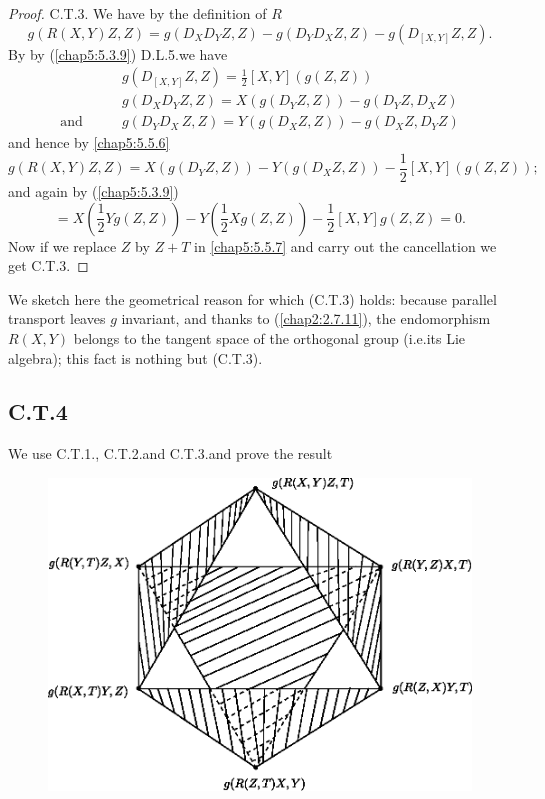 \begin{proof}
C.T.3. We have by the definition of $R$
\begin{equation*}
g(R(X,Y)Z,Z)=g(D_{X}D_{Y}Z,Z)-g(D_{Y}D_{X}Z,Z)-g(D_{[X,Y]}Z,Z).\tag{5.5.6}\label{chap5:5.5.6} 
\end{equation*}
By by (\ref{chap5:5.3.9}) D.L.5.\@ we have 
\begin{align*}
& g(D_{[X,Y]}Z,Z)=\frac{1}{2}[X,Y](g(Z,Z))\\
& g(D_{X}D_{Y}Z,Z)=X(g(D_{Y}Z,Z))-g(D_{Y}Z,D_{X}Z)\\
\text{and}\qquad & g(D_{Y}D_{X} \,
Z,Z)=Y(g(D_{X}Z,Z))-g(D_{X}Z,D_{Y}Z) 
\end{align*}\pageoriginale
and hence by \eqref{chap5:5.5.6}
\begin{equation*}
g(R(X,Y)Z,Z)=X(g(D_{Y}Z,Z))-Y(g(D_{X}Z,Z))-\frac{1}{2}[X,Y](g(Z,Z));\tag{5.5.7}\label{chap5:5.5.7} 
\end{equation*}
and again by (\ref{chap5:5.3.9})
$$
=X(\frac{1}{2}Yg(Z,Z))-Y(\frac{1}{2}Xg(Z,Z))-\frac{1}{2}[X,Y]g(Z,Z)=0.
$$
Now if we replace $Z$ by $Z+T$ in \eqref{chap5:5.5.7} and carry out the
cancellation we get C.T.3.
\end{proof}

\begin{note*}
We sketch here the geometrical reason for which (C.T.3) holds: because
parallel transport leaves $g$ invariant, and thanks to
(\ref{chap2:2.7.11}), the endomorphism $R(X,Y)$ belongs to the tangent
space of the orthogonal group (i.e.\@ its Lie algebra); this fact is
nothing but (C.T.3).
\end{note*}

\subsection*{C.T.4}
We use C.T.1., C.T.2.\@ and C.T.3.\@ and prove the result
\begin{figure}[H]
\centering
\includegraphics[scale=.75]{figures/chap5-fig1.eps}
\end{figure}

